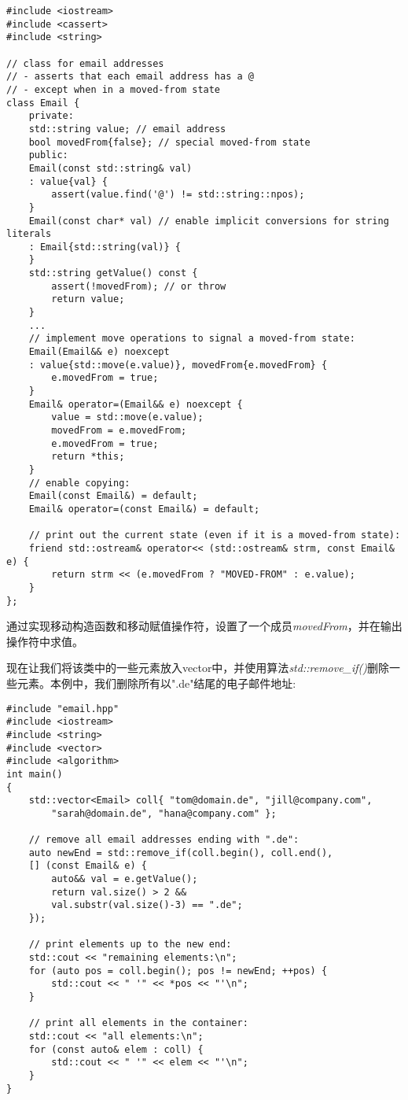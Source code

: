 \begin{lstlisting}[caption={}]
#include <iostream>
#include <cassert>
#include <string>

// class for email addresses
// - asserts that each email address has a @
// - except when in a moved-from state
class Email {
	private:
	std::string value; // email address
	bool movedFrom{false}; // special moved-from state
	public:
	Email(const std::string& val)
	: value{val} {
		assert(value.find('@') != std::string::npos);
	}
	Email(const char* val) // enable implicit conversions for string literals
	: Email{std::string(val)} {
	}
	std::string getValue() const {
		assert(!movedFrom); // or throw
		return value;
	}
	...
	// implement move operations to signal a moved-from state:
	Email(Email&& e) noexcept
	: value{std::move(e.value)}, movedFrom{e.movedFrom} {
		e.movedFrom = true;
	}
	Email& operator=(Email&& e) noexcept {
		value = std::move(e.value);
		movedFrom = e.movedFrom;
		e.movedFrom = true;
		return *this;
	}
	// enable copying:
	Email(const Email&) = default;
	Email& operator=(const Email&) = default;
	
	// print out the current state (even if it is a moved-from state):
	friend std::ostream& operator<< (std::ostream& strm, const Email& e) {
		return strm << (e.movedFrom ? "MOVED-FROM" : e.value);
	}
};
\end{lstlisting}

通过实现移动构造函数和移动赋值操作符，设置了一个成员\textit{movedFrom}，并在输出操作符中求值。\par

现在让我们将该类中的一些元素放入vector中，并使用算法\textit{std::remove\_if()}删除一些元素。本例中，我们删除所有以".de"结尾的电子邮件地址:\par

{\color{red}{lib/removeif.cpp}}\par

\begin{lstlisting}[caption={}]
#include "email.hpp"
#include <iostream>
#include <string>
#include <vector>
#include <algorithm>
int main()
{
	std::vector<Email> coll{ "tom@domain.de", "jill@company.com",
		"sarah@domain.de", "hana@company.com" };
	
	// remove all email addresses ending with ".de":
	auto newEnd = std::remove_if(coll.begin(), coll.end(),
	[] (const Email& e) {
		auto&& val = e.getValue();
		return val.size() > 2 &&
		val.substr(val.size()-3) == ".de";
	});

	// print elements up to the new end:
	std::cout << "remaining elements:\n";
	for (auto pos = coll.begin(); pos != newEnd; ++pos) {
		std::cout << " '" << *pos << "'\n";
	}

	// print all elements in the container:
	std::cout << "all elements:\n";
	for (const auto& elem : coll) {
		std::cout << " '" << elem << "'\n";
	}
}
\end{lstlisting}

